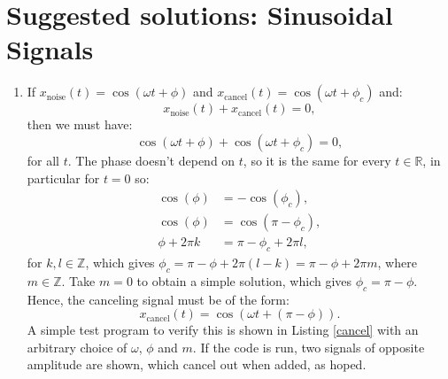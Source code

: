 \newpage
\section{Suggested solutions: Sinusoidal Signals}
\begin{enumerate}
\item If $x_{\text{noise}}(t)=\cos(\omega t+\phi)$ and $x_{\text{cancel}}(t)=\cos(\omega t+\phi_{c})$ and:
$$x_{\text{noise}}(t)+x_{\text{cancel}}(t)=0,$$
then we must have:
$$\cos(\omega t+\phi)+\cos(\omega t+\phi_{c})=0,$$
for all $t$. The phase doesn't depend on $t$, so it is the same for every $t\in\mathbb{R}$, in particular for $t=0$ so:
\begin{align*}
    \cos(\phi)&=-\cos(\phi_{c}), \\
    \cos(\phi)&=\cos(\pi -\phi_{c}), \\
    \phi+2\pi k&=\pi-\phi_{c}+2\pi l,
\end{align*}
for $k,l\in\mathbb{Z}$, which gives $\phi_{c}=\pi-\phi+2\pi(l-k)=\pi-\phi+2\pi m$, 
where $m\in\mathbb{Z}$. Take $m=0$ to obtain a simple solution, which gives $\phi_{c}=\pi -\phi$.
Hence, the canceling signal must be of the form:
$$x_{\text{cancel}}(t)=\cos(\omega t+(\pi-\phi)).$$
A simple test program to verify this is shown in Listing \ref{cancel} 
with an arbitrary choice of $\omega$, $\phi$ and $m$. 
If the code is run, two signals of opposite amplitude are shown, 
which cancel out when added, as hoped. 



\end{enumerate}
